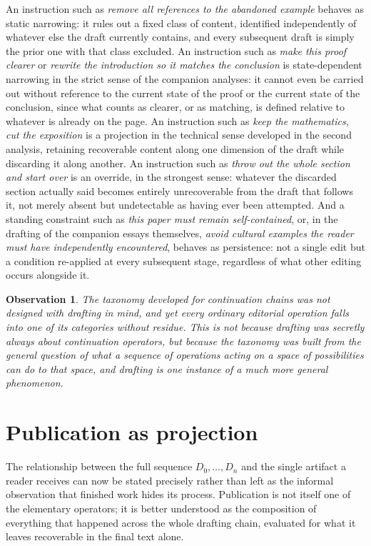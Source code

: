 \documentclass[11pt]{article}
\newtheorem{observation}{Observation}
\begin{document}
An instruction such as \emph{remove all references to the abandoned example} behaves as static narrowing: it rules out a fixed class of content, identified independently of whatever else the draft currently contains, and every subsequent draft is simply the prior one with that class excluded. An instruction such as \emph{make this proof clearer} or \emph{rewrite the introduction so it matches the conclusion} is state-dependent narrowing in the strict sense of the companion analyses: it cannot even be carried out without reference to the current state of the proof or the current state of the conclusion, since what counts as clearer, or as matching, is defined relative to whatever is already on the page. An instruction such as \emph{keep the mathematics, cut the exposition} is a projection in the technical sense developed in the second analysis, retaining recoverable content along one dimension of the draft while discarding it along another. An instruction such as \emph{throw out the whole section and start over} is an override, in the strongest sense: whatever the discarded section actually said becomes entirely unrecoverable from the draft that follows it, not merely absent but undetectable as having ever been attempted. And a standing constraint such as \emph{this paper must remain self-contained}, or, in the drafting of the companion essays themselves, \emph{avoid cultural examples the reader must have independently encountered}, behaves as persistence: not a single edit but a condition re-applied at every subsequent stage, regardless of what other editing occurs alongside it.

\begin{observation}
The taxonomy developed for continuation chains was not designed with drafting in mind, and yet every ordinary editorial operation falls into one of its categories without residue. This is not because drafting was secretly always about continuation operators, but because the taxonomy was built from the general question of what a sequence of operations acting on a space of possibilities can do to that space, and drafting is one instance of a much more general phenomenon.
\end{observation}

\section{Publication as projection}

The relationship between the full sequence $D_0, \ldots, D_n$ and the single artifact a reader receives can now be stated precisely rather than left as the informal observation that finished work hides its process. Publication is not itself one of the elementary operators; it is better understood as the composition of everything that happened across the whole drafting chain, evaluated for what it leaves recoverable in the final text alone.
\end{document}
